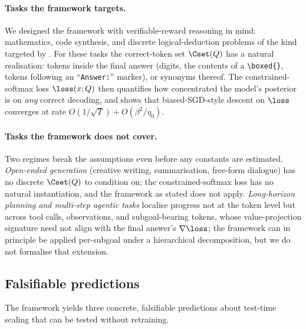 \paragraph{Tasks the framework targets.}
We designed the framework with verifiable-reward reasoning in mind:
mathematics, code synthesis, and discrete logical-deduction problems
of the kind targeted by
\cite{wei2022cot, openai2024o1, deepseek2025r1, qwen2025thinking}. For
these tasks the correct-token set $\Cset(Q)$ has a natural realisation:
tokens inside the final answer (digits, the contents of a
\verb|\boxed{}|, tokens following an ``\texttt{Answer:}'' marker), or
synonyms thereof. The constrained-softmax loss $\loss(x; Q)$ then
quantifies how concentrated the model's posterior is on
\emph{any} correct decoding, and 
shows that biased-SGD-style descent on $\loss$ converges at rate
$O(1/\sqrt T) + O(\beta^2 / \eta_0)$.

\paragraph{Tasks the framework does not cover.}
Two regimes break the assumptions even before any constants are
estimated. \emph{Open-ended generation} (creative writing,
summarisation, free-form dialogue) has no discrete $\Cset(Q)$ to
condition on; the constrained-softmax loss has no natural
instantiation, and the framework as stated does not apply. \emph{Long-horizon
planning and multi-step agentic tasks} localise progress not at the
token level but across tool calls, observations, and subgoal-bearing
tokens, whose value-projection signature need not align with the final
answer's $\nabla \loss$; the framework can in principle be applied
per-subgoal under a hierarchical decomposition, but we do not formalise
that extension.

\subsection{Falsifiable predictions}
\label{sec:discussion_predictions}

The framework yields three concrete, falsifiable predictions about
test-time scaling that can be tested without retraining.

